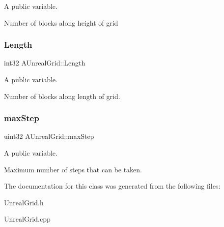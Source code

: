 A public variable. 

Number of blocks along height of grid \hypertarget{class_a_unreal_grid_aff61595921013715b51b18bbd5d624ea}{}\label{class_a_unreal_grid_aff61595921013715b51b18bbd5d624ea} 
\subsubsection{\texorpdfstring{Length}{Length}}
{\footnotesize\ttfamily int32 A\+Unreal\+Grid\+::\+Length}



A public variable. 

Number of blocks along length of grid. \hypertarget{class_a_unreal_grid_a17290d30345faf244ad5fabde26046ac}{}\label{class_a_unreal_grid_a17290d30345faf244ad5fabde26046ac} 
\subsubsection{\texorpdfstring{max\+Step}{maxStep}}
{\footnotesize\ttfamily uint32 A\+Unreal\+Grid\+::max\+Step}



A public variable. 

Maximum number of steps that can be taken. 

The documentation for this class was generated from the following files\+:\begin{DoxyCompactItemize}
\item 
Unreal\+Grid.\+h\item 
Unreal\+Grid.\+cpp\end{DoxyCompactItemize}

